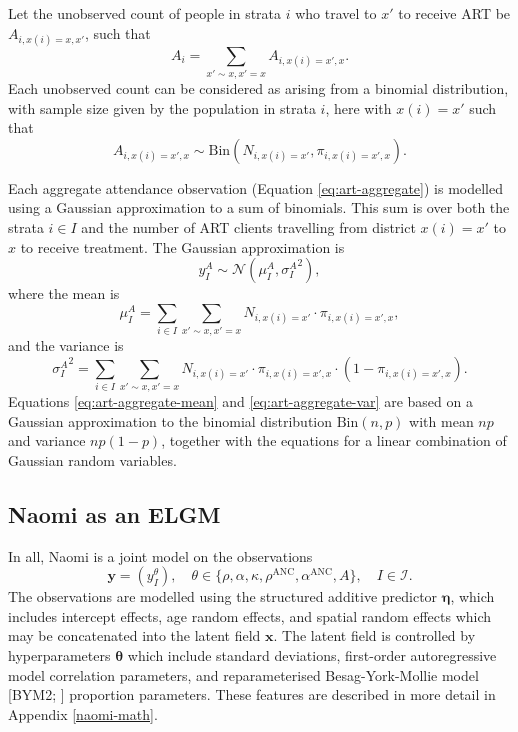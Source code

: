 \documentclass[a4paper, nobind]{templates/ociamthesis}
\begin{document}
Let the unobserved count of people in strata \(i\) who travel to \(x'\) to receive ART be \(A_{i, x(i) = x, x'}\), such that
\begin{equation}
A_i = \sum_{x' \sim x, x' = x} A_{i, x(i) = x', x}.
\end{equation}
Each unobserved count can be considered as arising from a binomial distribution, with sample size given by the population in strata \(i\), here with \(x(i) = x'\) such that
\begin{equation}
A_{i, x(i) = x', x} \sim \text{Bin}(N_{i, x(i) = x'}, \pi_{i, x(i) = x', x}).
\end{equation}

Each aggregate attendance observation (Equation \eqref{eq:art-aggregate}) is modelled using a Gaussian approximation to a sum of binomials.
This sum is over both the strata \(i \in I\) and the number of ART clients travelling from district \(x(i) = x'\) to \(x\) to receive treatment.
The Gaussian approximation is
\begin{equation}
y^{A}_I \sim \mathcal{N}(\mu^A_I, {\sigma^A_I}^2),
\end{equation}
where the mean is
\begin{equation}
\mu^A_I = \sum_{i \in I} \sum_{x' \sim x, x' = x} N_{i, x(i) = x'} \cdot \pi_{i, x(i) = x', x}, \label{eq:art-aggregate-mean}
\end{equation}
and the variance is
\begin{equation}
{\sigma^A_I}^2 = \sum_{i \in I} \sum_{x' \sim x, x' = x} N_{i, x(i) = x'} \cdot \pi_{i, x(i) = x', x} \cdot (1 -  \pi_{i, x(i) = x', x}). \label{eq:art-aggregate-var}
\end{equation}
Equations \eqref{eq:art-aggregate-mean} and \eqref{eq:art-aggregate-var} are based on a Gaussian approximation to the binomial distribution \(\text{Bin}(n, p)\) with mean \(np\) and variance \(np(1 - p)\), together with the equations for a linear combination of Gaussian random variables.

\hypertarget{naomi-elgm}{%
\subsection{Naomi as an ELGM}\label{naomi-elgm}}

In all, Naomi is a joint model on the observations
\begin{equation}
\mathbf{y} = (y^{\theta}_I), \quad \theta \in \{\rho, \alpha, \kappa, \rho^\text{ANC}, \alpha^\text{ANC}, A\}, \quad I \in \mathcal{I}.
\end{equation}
The observations are modelled using the structured additive predictor \(\boldsymbol{\mathbf{\eta}}\), which includes intercept effects, age random effects, and spatial random effects which may be concatenated into the latent field \(\mathbf{x}\).
The latent field is controlled by hyperparameters \(\boldsymbol{\mathbf{\theta}}\) which include standard deviations, first-order autoregressive model correlation parameters, and reparameterised Besag-York-Mollie model {[}BYM2; \textcite{simpson2017penalising}{]} proportion parameters.
These features are described in more detail in Appendix \ref{naomi-math}.
\end{document}
